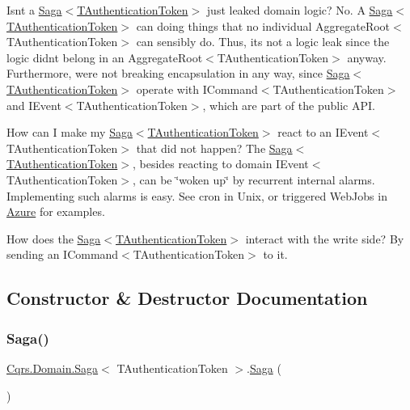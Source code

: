 Isn\textquotesingle{}t a \hyperlink{classCqrs_1_1Domain_1_1Saga_a1b6019cecbbf2572b64dd456cb5d91a2}{Saga$<$\+T\+Authentication\+Token$>$} just leaked domain logic? No. A \hyperlink{classCqrs_1_1Domain_1_1Saga_a1b6019cecbbf2572b64dd456cb5d91a2}{Saga$<$\+T\+Authentication\+Token$>$} can doing things that no individual Aggregate\+Root$<$\+T\+Authentication\+Token$>$ can sensibly do. Thus, it\textquotesingle{}s not a logic leak since the logic didn\textquotesingle{}t belong in an Aggregate\+Root$<$\+T\+Authentication\+Token$>$ anyway. Furthermore, we\textquotesingle{}re not breaking encapsulation in any way, since \hyperlink{classCqrs_1_1Domain_1_1Saga_a1b6019cecbbf2572b64dd456cb5d91a2}{Saga$<$\+T\+Authentication\+Token$>$} operate with I\+Command$<$\+T\+Authentication\+Token$>$ and I\+Event$<$\+T\+Authentication\+Token$>$, which are part of the public A\+PI.

How can I make my \hyperlink{classCqrs_1_1Domain_1_1Saga_a1b6019cecbbf2572b64dd456cb5d91a2}{Saga$<$\+T\+Authentication\+Token$>$} react to an I\+Event$<$\+T\+Authentication\+Token$>$ that did not happen? The \hyperlink{classCqrs_1_1Domain_1_1Saga_a1b6019cecbbf2572b64dd456cb5d91a2}{Saga$<$\+T\+Authentication\+Token$>$}, besides reacting to domain I\+Event$<$\+T\+Authentication\+Token$>$, can be \char`\"{}woken up\char`\"{} by recurrent internal alarms. Implementing such alarms is easy. See cron in Unix, or triggered Web\+Jobs in \hyperlink{namespaceCqrs_1_1Azure}{Azure} for examples.

How does the \hyperlink{classCqrs_1_1Domain_1_1Saga_a1b6019cecbbf2572b64dd456cb5d91a2}{Saga$<$\+T\+Authentication\+Token$>$} interact with the write side? By sending an I\+Command$<$\+T\+Authentication\+Token$>$ to it. 

\subsection{Constructor \& Destructor Documentation}
\mbox{\label{classCqrs_1_1Domain_1_1Saga_a1b6019cecbbf2572b64dd456cb5d91a2}} 
\subsubsection{\texorpdfstring{Saga()}{Saga()}\hspace{0.1cm}{\footnotesize\ttfamily [1/3]}}
{\footnotesize\ttfamily \hyperlink{classCqrs_1_1Domain_1_1Saga}{Cqrs.\+Domain.\+Saga}$<$ T\+Authentication\+Token $>$.\hyperlink{classCqrs_1_1Domain_1_1Saga}{Saga} (\begin{DoxyParamCaption}{ }\end{DoxyParamCaption})\hspace{0.3cm}{\ttfamily [protected]}}



